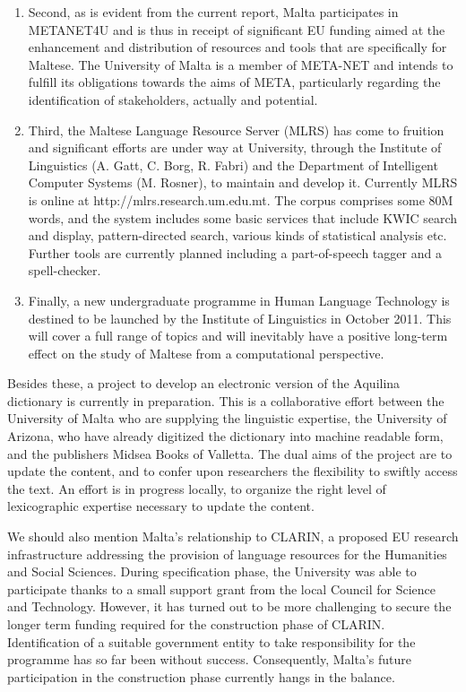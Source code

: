 \documentclass[]{../../metanetpaper}
\begin{document}
\begin{multicols}{2}
\begin{enumerate}
\item Second, as is evident from the current report, Malta participates in METANET4U and is thus in receipt of significant EU funding aimed at the enhancement and distribution of resources and tools that are specifically for Maltese. The University of Malta is a member of META-NET and intends to fulfill its obligations towards the aims of META, particularly regarding the identification of stakeholders, actually and potential. 

\item Third, the Maltese Language Resource Server (MLRS) has come to fruition and significant efforts are under way at University, through the Institute of Linguistics (A. Gatt, C. Borg, R. Fabri) and the Department of Intelligent Computer Systems (M. Rosner), to maintain and develop it. Currently MLRS is online at http://mlrs.research.um.edu.mt. The corpus comprises some 80M words, and the system includes some basic services that include KWIC search and display, pattern-directed search, various kinds of statistical analysis etc. Further tools are currently planned including a part-of-speech tagger and a spell-checker.

\item Finally, a new undergraduate programme in Human Language Technology is destined to be launched by the Institute of Linguistics in October 2011. This will cover a full range of topics and will inevitably have a positive long-term effect on the study of Maltese from a computational perspective.
\end{enumerate}

Besides these, a project to develop an electronic version of the Aquilina dictionary \cite{Aquilina:1987,Aquilina:1990} is currently in preparation. This is a collaborative effort between the University of Malta who are supplying the linguistic expertise, the University of Arizona, who have already digitized the dictionary into machine readable form, and the publishers Midsea Books of Valletta. The dual aims of the project are to update the content, and to confer upon researchers the flexibility to swiftly access the text. An effort is in progress locally, to organize the right level of lexicographic expertise necessary to update the content.

We should also mention Malta’s relationship to CLARIN, a proposed EU research infrastructure addressing the provision of language resources for the Humanities and Social Sciences. During specification phase, the University was able to participate thanks to a small support grant from the local Council for Science and Technology. However, it has turned out to be more challenging to secure the longer term funding required for the construction phase of CLARIN. Identification of a suitable government entity to take responsibility for the programme has so far been without success. Consequently, Malta’s future participation in the construction phase currently hangs in the balance.
  

\end{multicols}
\end{document}
